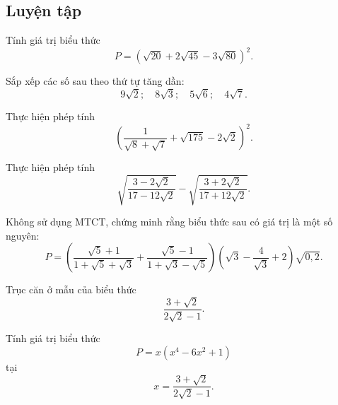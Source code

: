\begin{practice}
    \subsection{Luyện tập}

    \begin{questions}[resume=SBT]
        \item Tính giá trị biểu thức
        \[
            P=(\sqrt{20}+2\sqrt{45}-3\sqrt{80})^2.
        \]

        \answerline
        \answerline

        \item Sắp xếp các số sau theo thứ tự tăng dần:
        \[
            9\sqrt2;\quad 8\sqrt3;\quad 5\sqrt6;\quad 4\sqrt7.
        \]

        \answerline

        \item Thực hiện phép tính
        \[
            \left(\dfrac1{\sqrt8+\sqrt7}+\sqrt{175}-2\sqrt2\right)^2.
        \]

        \answerline
        \answerline

        \item Thực hiện phép tính
        \[
            \sqrt{\dfrac{3-2\sqrt2}{17-12\sqrt2}}
            -\sqrt{\dfrac{3+2\sqrt2}{17+12\sqrt2}}.
        \]

        \answerline
        \answerline

        \item Không sử dụng MTCT, chứng minh rằng biểu thức sau có giá trị là một số nguyên:
        \[
            P=
            \left(
                \dfrac{\sqrt5+1}{1+\sqrt5+\sqrt3}
                +\dfrac{\sqrt5-1}{1+\sqrt3-\sqrt5}
            \right)
            \left(\sqrt3-\dfrac4{\sqrt3}+2\right)
            \sqrt{0,2}.
        \]

        \answerline
        \answerline
        \answerline

        \item
        \begin{questions}
            \item Trục căn ở mẫu của biểu thức
            \[
                \dfrac{3+\sqrt2}{2\sqrt2-1}.
            \]
            \item Tính giá trị biểu thức
            \[
                P=x(x^4-6x^2+1)
            \]
            tại
            \[
                x=\dfrac{3+\sqrt2}{2\sqrt2-1}.
            \]
        \end{questions}

        \answerline
        \answerline
    \end{questions}
\end{practice}

